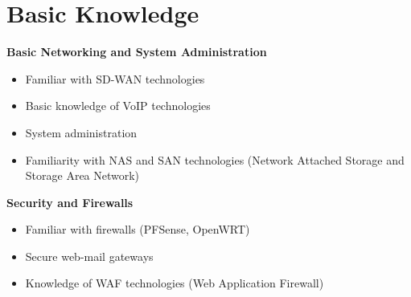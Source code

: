 \section{Basic Knowledge}
\begin{paracol}{2}
	\begin{onecolentry}
		\textbf{Basic Networking and System Administration}
		\begin{itemize}[leftmargin=0.5cm, itemsep=0.1cm]
			\item Familiar with SD-WAN technologies
			\item Basic knowledge of VoIP technologies
			\item System administration
			\item Familiarity with NAS and SAN technologies (Network Attached Storage and Storage Area Network)
		\end{itemize}
	\end{onecolentry}
	
	\switchcolumn
	\begin{onecolentry}
		\textbf{Security and Firewalls}
		\begin{itemize}[leftmargin=0.5cm, itemsep=0.1cm]
			\item Familiar with firewalls (PFSense, OpenWRT)
			\item Secure web-mail gateways
			\item Knowledge of WAF technologies (Web Application Firewall)
		\end{itemize}
	\end{onecolentry}
\end{paracol}
